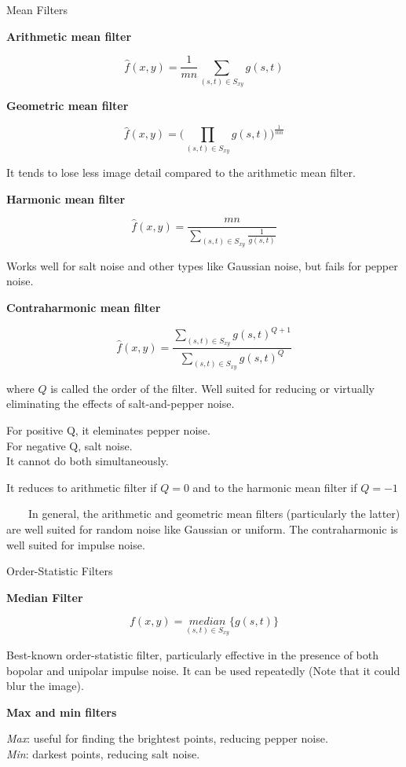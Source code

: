 \documentclass[]{article}
\begin{document}
Mean Filters

\textbf{Arithmetic mean filter}

\[\hat{f}(x,y)=\dfrac{1}{mn}\sum\limits_{(s,t)\in S_{xy}}g(s,t)\]

\textbf{Geometric mean filter}

\[\hat{f}(x,y)=\Bigg(\prod\limits_{(s,t)\in S_{xy}}g(s,t)\Bigg)^{\frac{1}{mn}}\]

It tends to lose less image detail compared to the arithmetic mean
filter.

\textbf{Harmonic mean filter}

\[\hat{f}(x,y)=\dfrac{mn}{\sum\limits_{(s,t)\in S_{xy}}\frac{1}{g(s,t)}}\]

Works well for salt noise and other types like Gaussian noise, but fails
for pepper noise.

\textbf{Contraharmonic mean filter}

\[\hat{f}(x,y)=\dfrac{\sum\limits_{(s,t)\in S_{xy}}g(s,t)^{Q+1}}{\sum\limits_{(s,t)\in S_{xy}}g(s,t)^{Q}}\]

where \(Q\) is called the order of the filter. Well suited for reducing
or virtually eliminating the effects of salt-and-pepper noise.

For positive Q, it eleminates pepper noise.\\
 For negative Q, salt noise.\\
 It cannot do both simultaneously.

It reduces to arithmetic filter if \(Q=0\) and to the harmonic mean
filter if \(Q=-1\)

\(\quad\quad\)In general, the arithmetic and geometric mean filters
(particularly the latter) are well suited for random noise like Gaussian
or uniform. The contraharmonic is well suited for impulse noise.

Order-Statistic Filters

\textbf{Median Filter}

\[f(x,y)=\underset{(s,t)\in S_{xy}}{median}\{g(s,t)\}\]

Best-known order-statistic filter, particularly effective in the
presence of both bopolar and unipolar impulse noise. It can be used
repeatedly (Note that it could blur the image).

\textbf{Max and min filters}

\emph{Max}: useful for finding the brightest points, reducing pepper
noise.\\
 \emph{Min}: darkest points, reducing salt noise.
\end{document}
